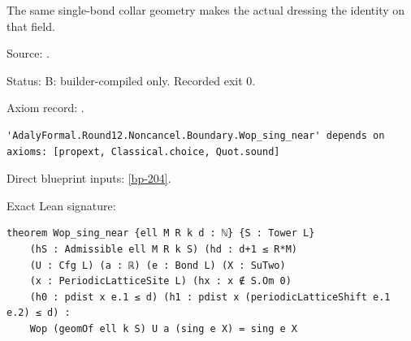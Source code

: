 \begin{theorem}[bp-205]
\label{bp-205}
\leanok
The same single-bond collar geometry makes the actual dressing the identity on that field.

\par Source: \texttt{}.
\par Status: B: builder-compiled only. Recorded exit 0.
\par Axiom record: \texttt{}.
\begin{verbatim}
'AdalyFormal.Round12.Noncancel.Boundary.Wop_sing_near' depends on axioms: [propext, Classical.choice, Quot.sound]
\end{verbatim}
\par Direct blueprint inputs: \ref{bp-204}.
\par Exact Lean signature:
\begin{verbatim}
theorem Wop_sing_near {ell M R k d : ℕ} {S : Tower L}
    (hS : Admissible ell M R k S) (hd : d+1 ≤ R*M)
    (U : Cfg L) (a : ℝ) (e : Bond L) (X : SuTwo)
    (x : PeriodicLatticeSite L) (hx : x ∉ S.Om 0)
    (h0 : pdist x e.1 ≤ d) (h1 : pdist x (periodicLatticeShift e.1 e.2) ≤ d) :
    Wop (geomOf ell k S) U a (sing e X) = sing e X
\end{verbatim}
\end{theorem}

